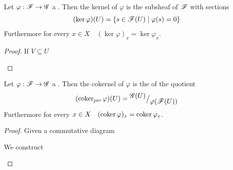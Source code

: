 \documentclass[../main.tex]{subfiles}
\begin{document}
\begin{theorem}
  Let \(\varphi: \mathscr{F} \to \mathscr{G}\) a .
  Then the kernel of \(\varphi\) is the subsheaf of \(\mathscr{F}\) with sections
  \begin{equation*}
    (\ker \varphi)(U) = \{ s \in \mathscr{F}(U) \mid \varphi(s) = 0 \}
  \end{equation*}
  Furthermore for every \(x \in X \quad (\ker \varphi)_{x} = \ker \varphi_{x}\).
\end{theorem}
\begin{proof}
  If \(V \subseteq U\)
  \begin{center}
  \end{center}
 \end{proof}


\begin{theorem}
  Let \(\varphi: \mathscr{F} \to \mathscr{G}\) a .
  Then the cokernel of \(\varphi\) is the  of the quotient 
  \begin{equation*}
    (\operatorname{coker}_{\operatorname*{pre}} \varphi)(U) = {^{\textstyle \mathscr{G}(U)}\big/_{\textstyle \varphi(\mathscr{F}(U))}}
  \end{equation*}
  Furthermore for every \(x \in X \quad (\operatorname*{coker} \varphi)_{x} = \operatorname*{coker} \varphi_{x}\).
\end{theorem}
\begin{proof}
  Given a commutative diagram
  \begin{center}
  \end{center}
  We construct
  \begin{center}
  \end{center}
\end{proof}
\end{document}
